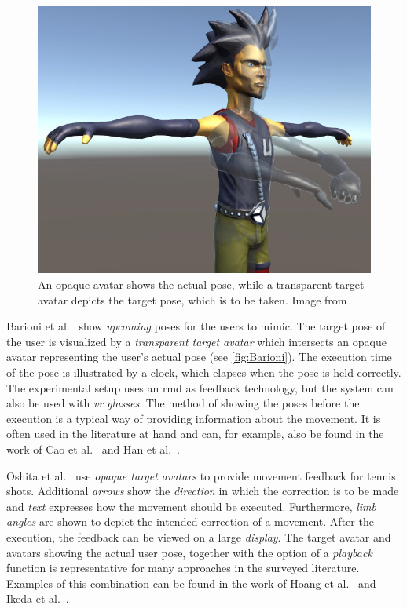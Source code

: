 \begin{figure}[h!t]
    \centering
    \includegraphics[width=0.6\linewidth]{pictures/Barioni.png}
    \caption[Transparent avatar for motion feedback.]{An opaque avatar shows the actual pose, while a transparent target avatar depicts the target pose, which is to be taken. Image from~\cite{barioni2019bvr}.\label{fig:Barioni}}
\end{figure}

Barioni et al.~\cite{barioni2019bvr} show \emph{upcoming} poses for the users to mimic. The target pose of the user is visualized by a \emph{transparent target avatar} which intersects an opaque avatar representing the user's actual pose (see \autoref{fig:Barioni}). The execution time of the pose is illustrated by a clock, which elapses when the pose is held correctly. The experimental setup uses an \acrshort{rmd} as feedback technology, but the system can also be used with \emph{\acrshort{vr} glasses}. The method of showing the poses before the execution is a typical way of providing information about the movement. It is often used in the literature at hand and can, for example, also be found in the work of Cao et al.~\cite{cao2020esa} and Han et al.~\cite{han2016ara}.


Oshita et al.~\cite{oshita2018sts} use \emph{opaque target avatars} to provide movement feedback for tennis shots. Additional \emph{arrows} show the \emph{direction} in which the correction is to be made and \emph{text} expresses how the movement should be executed. Furthermore, \emph{limb angles} are shown to depict the intended correction of a movement. After the execution, the feedback can be viewed on a large \emph{display}. The target avatar and avatars showing the actual user pose, together with the option of a \emph{playback} function is representative for many approaches in the surveyed literature. Examples of this combination can be found in the work of Hoang et al.~\cite{hoang2016orp} and Ikeda et al.~\cite{ikeda2018arb}. 

